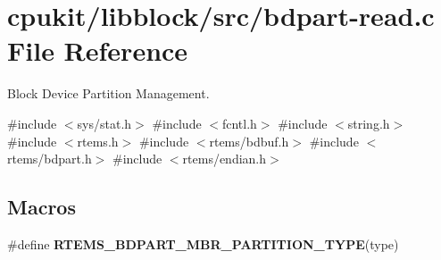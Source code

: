 \hypertarget{bdpart-read_8c}{}\section{cpukit/libblock/src/bdpart-\/read.c File Reference}
\label{bdpart-read_8c}


Block Device Partition Management.  


{\ttfamily \#include $<$sys/stat.\+h$>$}\newline
{\ttfamily \#include $<$fcntl.\+h$>$}\newline
{\ttfamily \#include $<$string.\+h$>$}\newline
{\ttfamily \#include $<$rtems.\+h$>$}\newline
{\ttfamily \#include $<$rtems/bdbuf.\+h$>$}\newline
{\ttfamily \#include $<$rtems/bdpart.\+h$>$}\newline
{\ttfamily \#include $<$rtems/endian.\+h$>$}\newline
\subsection*{Macros}
\begin{DoxyCompactItemize}
\item 
\#define {\bfseries R\+T\+E\+M\+S\+\_\+\+B\+D\+P\+A\+R\+T\+\_\+\+M\+B\+R\+\_\+\+P\+A\+R\+T\+I\+T\+I\+O\+N\+\_\+\+T\+Y\+PE}(type)
\end{DoxyCompactItemize}
